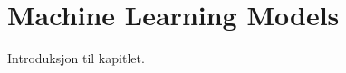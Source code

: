 \documentclass[../../main.tex]{subfiles}
\begin{document}

\section{Machine Learning Models}

Introduksjon til kapitlet.

\end{document}
